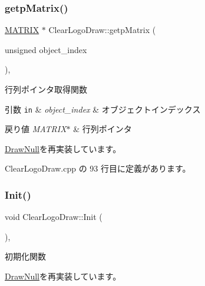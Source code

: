 \subsubsection{\texorpdfstring{getp\+Matrix()}{getpMatrix()}}
{\footnotesize\ttfamily \mbox{\hyperlink{_vector3_d_8h_a032295cd9fb1b711757c90667278e744}{M\+A\+T\+R\+IX}} $\ast$ Clear\+Logo\+Draw\+::getp\+Matrix (\begin{DoxyParamCaption}\item[{unsigned}]{object\+\_\+index }\end{DoxyParamCaption})\hspace{0.3cm}{\ttfamily [override]}, {\ttfamily [virtual]}}



行列ポインタ取得関数 


\begin{DoxyParams}[1]{引数}
\mbox{\tt in}  & {\em object\+\_\+index} & オブジェクトインデックス \\
\hline
\end{DoxyParams}

\begin{DoxyRetVals}{戻り値}
{\em M\+A\+T\+R\+I\+X$\ast$} & 行列ポインタ \\
\hline
\end{DoxyRetVals}


\mbox{\hyperlink{class_draw_null_a9aac059eb3b5d1f77e8bd3aa0647cff9}{Draw\+Null}}を再実装しています。



 Clear\+Logo\+Draw.\+cpp の 93 行目に定義があります。

\mbox{\label{class_clear_logo_draw_a9af656c0a8ebfb5fa133a0983add6ffd}} 
\subsubsection{\texorpdfstring{Init()}{Init()}}
{\footnotesize\ttfamily void Clear\+Logo\+Draw\+::\+Init (\begin{DoxyParamCaption}{ }\end{DoxyParamCaption})\hspace{0.3cm}{\ttfamily [override]}, {\ttfamily [virtual]}}



初期化関数 



\mbox{\hyperlink{class_draw_null_a20aef1e54c1a158b741bfd731e18efdf}{Draw\+Null}}を再実装しています。



